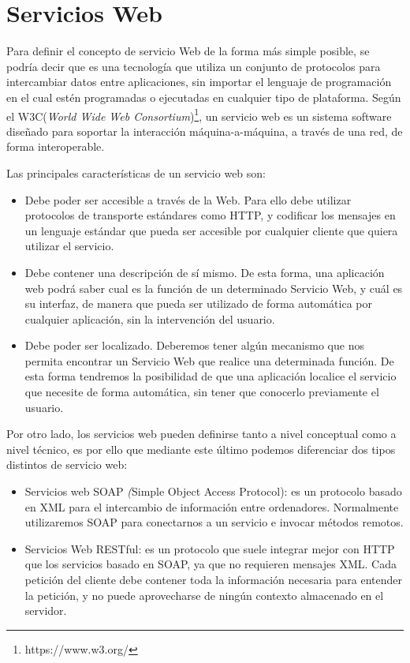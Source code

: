 \section{Servicios Web}
\label{cap:sec:servicios_web}

Para definir el concepto de servicio Web de la forma más simple posible, se podría decir que es una tecnología que utiliza un conjunto de protocolos para intercambiar datos entre aplicaciones, sin importar el lenguaje de programación en el cual estén programadas o ejecutadas en cualquier tipo de plataforma.\citep{wiki:w3c2004} Según el W3C(\textit{World Wide Web Consortium})\footnote{https://www.w3.org/}, un servicio web es un sistema software diseñado para soportar la interacción máquina-a-máquina, a través de una red, de forma interoperable. 
\newline



Las principales características de un servicio web son:
\citep{TorresJoaquin2017SC}


\begin{itemize}
\item Debe poder ser accesible a través de la Web. Para ello debe utilizar protocolos de transporte estándares como HTTP, y codificar los mensajes en un lenguaje estándar que pueda ser accesible por cualquier cliente que quiera utilizar el servicio. 
\item Debe contener una descripción de sí mismo. De esta forma, una aplicación web podrá saber cual es la función de un determinado Servicio Web, y cuál es su interfaz, de manera que pueda ser utilizado de forma automática por cualquier aplicación, sin la intervención del usuario.
\item Debe poder ser localizado. Deberemos tener algún mecanismo que nos permita encontrar un Servicio Web que realice una determinada función. De esta forma tendremos la posibilidad de que una aplicación localice el servicio que necesite de forma automática, sin tener que conocerlo previamente el usuario.
\end{itemize}

Por otro lado, los servicios web pueden definirse tanto a nivel conceptual como a nivel técnico, es por ello que mediante este último podemos diferenciar dos tipos distintos de servicio web:
\begin{itemize}
	\item Servicios web SOAP  \textit({Simple Object Access Protocol}): es un protocolo basado en XML para el intercambio de información entre ordenadores. Normalmente utilizaremos SOAP para conectarnos a un servicio e invocar métodos remotos.
	\item Servicios Web RESTful: es un protocolo que suele integrar mejor con HTTP que los servicios basado en SOAP, ya que no requieren mensajes XML. Cada petición del cliente debe contener toda la información necesaria para entender la petición, y no puede aprovecharse de ningún contexto almacenado en el servidor.
	
\end{itemize}

